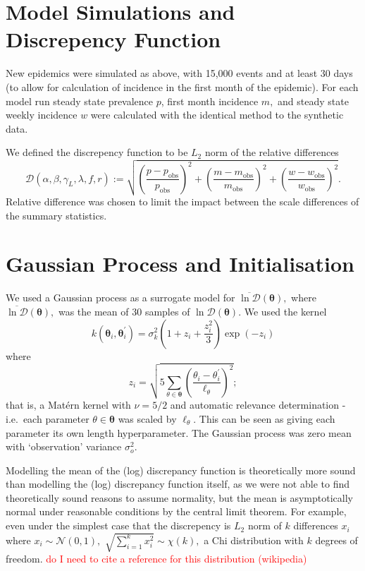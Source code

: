 \section{Model Simulations and Discrepency Function}

New epidemics were simulated as above, with 15,000 events and at least 30
days (to allow for calculation of incidence in the first month of the
epidemic). For each model run steady state prevalence $p$,
first month incidence $m,$ and steady state weekly incidence $w$ were
calculated with the identical method to the synthetic data.

We defined the discrepency function to be $L_2$ norm of the relative
differences
$$
    \mathcal{D}(\alpha, \beta, \gamma_L, \lambda, f, r)
    := \sqrt{
        \left(\frac{p - p_\text{obs}}{p_\text{obs}}\right)^2
        + \left(\frac{m - m_\text{obs}}{m_\text{obs}}\right)^2
        + \left(\frac{w - w_\text{obs}}{w_\text{obs}}\right)^2
    }.
$$
Relative difference was chosen to limit the impact between the scale
differences of the summary statistics.

\section{Gaussian Process and Initialisation}

We used a Gaussian process as a surrogate model for
$\overline{\ln\mathcal{D}}(\bm{\theta}),$ where
$\overline{\ln\mathcal{D}}(\bm{\theta}),$ was the mean of 30 samples of
$\ln\mathcal{D}(\bm{\theta}).$
We used the kernel
$$
    k(\bm{\theta}_i, \bm{\theta}_i^\prime)
    = \sigma_k^2 (1 + z_i + \frac{z_i^2}{3})\exp(-z_i)
$$
where
$$
    z_i = \sqrt{
        5 \sum_{\theta\in \bm{\theta}}\left(
        \frac{\theta_i - \theta_i^\prime}{\ell_\theta}
        \right)^2
    };
$$ that is, a Mat\'ern kernel with $\nu = 5/2$ and automatic
relevance determination - i.e.\ each parameter $\theta\in\bm{\theta}$ was
scaled by $\ell_\theta.$ This can be seen as giving each parameter its own
length hyperparameter. The Gaussian process was zero mean
with `observation' variance $\sigma^2_o.$

Modelling the mean of the (log) discrepancy function is theoretically more 
sound than modelling the (log) discrepancy function itself, as 
we were not able to find theoretically sound reasons to assume normality,
but the mean is asymptotically normal under reasonable conditions by the
central limit theorem. For example, even under the simplest case that the
discrepency is $L_2$ norm of $k$ differences $x_i$ where
$x_i\sim\mathcal{N}(0, 1),$ $\sqrt{\sum_{i=1}^k x_i^2}\sim\chi(k),$ a Chi 
distribution with $k$ degrees of freedom. 
\textcolor{red}{
    do I need to cite a reference for this distribution (wikipedia)
} 

